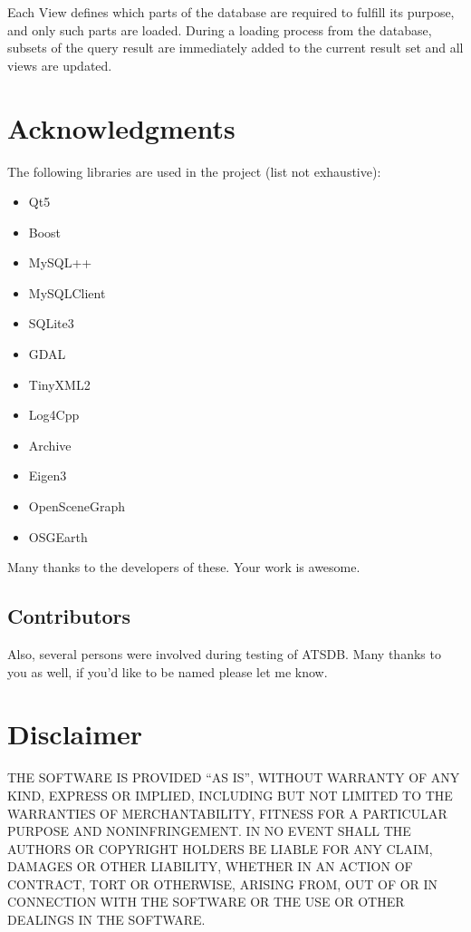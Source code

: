 Each View defines which parts of the database are required to fulfill its purpose, and only such parts are loaded.  During a loading process from the database, subsets of the query result are immediately added to the current result set and all views are updated. 

\section{Acknowledgments}

The following libraries are used in the project (list not exhaustive):

\begin{itemize}  
\item Qt5
\item Boost
\item MySQL++
\item MySQLClient
\item SQLite3
\item GDAL
\item TinyXML2
\item Log4Cpp
\item Archive
\item Eigen3
\item OpenSceneGraph
\item OSGEarth
\end{itemize}

Many thanks to the developers of these. Your work is awesome.

\subsection{Contributors}

Also, several persons were involved during testing of ATSDB. Many thanks to you as well, if you'd like to be named please let me know.

\section{Disclaimer}

THE SOFTWARE IS PROVIDED ``AS IS'', WITHOUT WARRANTY OF ANY KIND, EXPRESS OR IMPLIED, INCLUDING BUT NOT LIMITED TO THE WARRANTIES OF MERCHANTABILITY, FITNESS FOR A PARTICULAR PURPOSE AND NONINFRINGEMENT. IN NO EVENT SHALL THE AUTHORS OR COPYRIGHT HOLDERS BE LIABLE FOR ANY CLAIM, DAMAGES OR OTHER LIABILITY, WHETHER IN AN ACTION OF CONTRACT, TORT OR OTHERWISE, ARISING FROM, OUT OF OR IN CONNECTION WITH THE SOFTWARE OR THE USE OR OTHER DEALINGS IN THE SOFTWARE.
